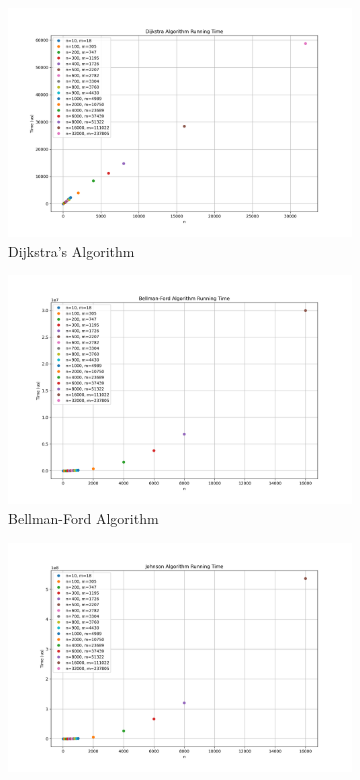\documentclass[11pt]{article}
\theoremstyle{plain}
\begin{document}
\begin{figure}[H]
  \centering
  \begin{subfigure}[b]{0.45\textwidth}
      \centering
      \includegraphics[width=\textwidth]{../results/Dijkstra_running_time.png}
      \caption{Dijkstra's Algorithm}
  \end{subfigure}
  \hfill
  \begin{subfigure}[b]{0.45\textwidth}
      \centering
      \includegraphics[width=\textwidth]{../results/Bellman-Ford_running_time.png}
      \caption{Bellman-Ford Algorithm}
  \end{subfigure}
  \vfill
  \begin{subfigure}[b]{0.45\textwidth}
      \centering
      \includegraphics[width=\textwidth]{../results/Johnson_running_time.png}

\end{subfigure}
\end{figure}
\end{document}

